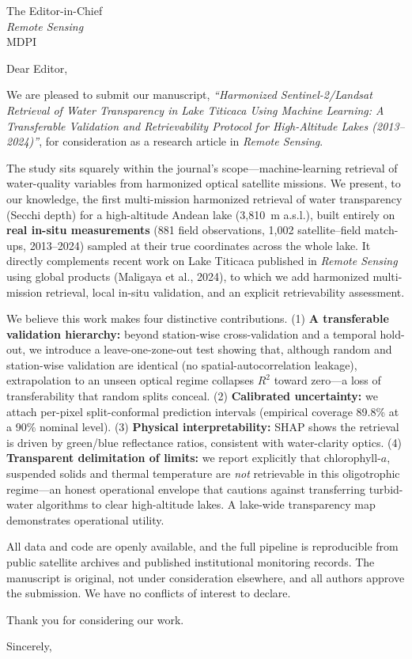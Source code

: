 \documentclass[11pt]{letter}
\begin{document}
\begin{letter}{The Editor-in-Chief\\ \textit{Remote Sensing}\\ MDPI}
\opening{Dear Editor,}

We are pleased to submit our manuscript, \textit{``Harmonized Sentinel-2/Landsat
Retrieval of Water Transparency in Lake Titicaca Using Machine Learning: A
Transferable Validation and Retrievability Protocol for High-Altitude Lakes
(2013--2024)''}, for consideration as a research article in \textit{Remote Sensing}.

The study sits squarely within the journal's scope---machine-learning retrieval of
water-quality variables from harmonized optical satellite missions. We present, to
our knowledge, the first multi-mission harmonized retrieval of water transparency
(Secchi depth) for a high-altitude Andean lake (3{,}810~m a.s.l.), built entirely
on \textbf{real in-situ measurements} (881 field observations, 1{,}002
satellite--field match-ups, 2013--2024) sampled at their true coordinates across
the whole lake. It directly complements recent work on Lake Titicaca published in
\textit{Remote Sensing} using global products (Maligaya et al., 2024), to which we
add harmonized multi-mission retrieval, local in-situ validation, and an explicit
retrievability assessment.

We believe this work makes four distinctive contributions. (1) \textbf{A
transferable validation hierarchy:} beyond station-wise cross-validation and a
temporal hold-out, we introduce a leave-one-zone-out test showing that, although
random and station-wise validation are identical (no spatial-autocorrelation
leakage), extrapolation to an unseen optical regime collapses $R^2$ toward zero---a
loss of transferability that random splits conceal. (2) \textbf{Calibrated
uncertainty:} we attach per-pixel split-conformal prediction intervals (empirical
coverage 89.8\% at a 90\% nominal level). (3) \textbf{Physical interpretability:}
SHAP shows the retrieval is driven by green/blue reflectance ratios, consistent
with water-clarity optics. (4) \textbf{Transparent delimitation of limits:} we
report explicitly that chlorophyll-$a$, suspended solids and thermal temperature
are \emph{not} retrievable in this oligotrophic regime---an honest operational
envelope that cautions against transferring turbid-water algorithms to clear
high-altitude lakes. A lake-wide transparency map demonstrates operational utility.

All data and code are openly available, and the full pipeline is reproducible from
public satellite archives and published institutional monitoring records. The
manuscript is original, not under consideration elsewhere, and all authors approve
the submission. We have no conflicts of interest to declare.

Thank you for considering our work.

\closing{Sincerely,}
\end{letter}
\end{document}
